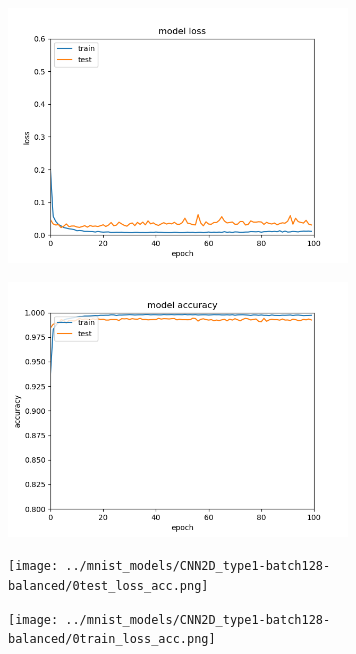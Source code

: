 \documentclass[12pt]{article}
\begin{document}
\begin{multicols}{2}
    \noindent
    \begin{minipage}{\linewidth}
        \centering
        \includegraphics[width=9cm]{../mnist_models/CNN2D_type0-batch128-balanced/0test_loss_acc.png}
        \label{fig:cc}
    \end{minipage}
    \bigskip

    \noindent
    \begin{minipage}{\linewidth}
        \centering
        \includegraphics[width=9cm]{../mnist_models/CNN2D_type0-batch128-balanced/0train_loss_acc.png}
        \label{fig:cc}
    \end{minipage}
    \bigskip
\end{multicols}

\begin{multicols}{2}
    \noindent
    \begin{minipage}{\linewidth}
        \centering
        \texttt{[image: ../mnist\_models/CNN2D\_type1-batch128-balanced/0test\_loss\_acc.png]}
        \label{fig:cc}
    \end{minipage}
    \bigskip

    \noindent
    \begin{minipage}{\linewidth}
        \centering
        \texttt{[image: ../mnist\_models/CNN2D\_type1-batch128-balanced/0train\_loss\_acc.png]}
        \label{fig:cc}
    \end{minipage}
    \bigskip
\end{multicols}
\end{document}
